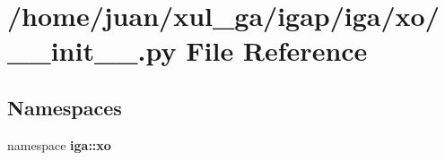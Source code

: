 \section{/home/juan/xul\_\-ga/igap/iga/xo/\_\-\_\-init\_\-\_\-.py File Reference}
\label{iga_2xo_2____init_____8py}
\subsection*{Namespaces}
\begin{CompactItemize}
\item 
namespace {\bf iga::xo}
\end{CompactItemize}

